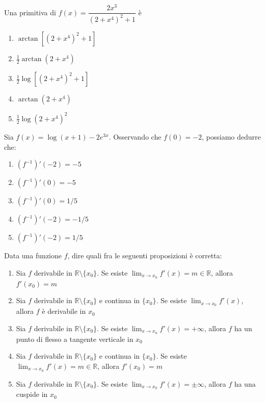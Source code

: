 \begin{quiz}
Una primitiva di $f(x)=\dfrac{2x^3}{(2+x^4)^2+1}$ \`e
\begin{enumerate}
\item $\arctan[(2+x^4)^2+1]$
\item $\frac12\arctan(2+x^4)$
\item $\frac12\log[(2+x^4)^2+1]$
\item $\arctan(2+x^4)$
\item $\frac12\log(2+x^4)^2$
\end{enumerate}
\end{quiz}

\begin{quiz}
Sia $f(x)=\log(x+1)-2e^{3x}$. Osservando che $f(0)=-2$, possiamo dedurre che:
\begin{enumerate}
\item $(f^{-1})\prime(-2)=-5$
\item $(f^{-1})\prime(0)=-5$
\item $(f^{-1})\prime(0)=1/5$
\item $(f^{-1})\prime(-2)=-1/5$
\item $(f^{-1})\prime(-2)=1/5$
\end{enumerate}
\end{quiz}

\begin{quiz}
Data una funzione $f$, dire quali fra le seguenti proposizioni \`e corretta:
\begin{enumerate}
\item Sia $f$ derivabile in $\mathbb R\setminus\{x_0\}$. Se esiste $\lim_{x\to x_0}f\prime(x)=m\in\mathbb R$, allora $f\prime(x_0)=m$
\item Sia $f$ derivabile in $\mathbb R\setminus\{x_0\}$ e continua in $\{x_0\}$. Se esiste $\lim_{x\to x_0}f\prime(x)$, allora $f$ \`e derivabile in $x_0$
\item Sia $f$ derivabile in $\mathbb R\setminus\{x_0\}$. Se esiste $\lim_{x\to x_0}f\prime(x)=+\infty$, allora $f$ ha un punto di flesso a tangente verticale in $x_0$
\item Sia $f$ derivabile in $\mathbb R\setminus\{x_0\}$ e continua in $\{x_0\}$. Se esiste $\lim_{x\to x_0}f\prime(x)=m\in\mathbb R$, allora $f\prime(x_0)=m$
\item Sia $f$ derivabile in $\mathbb R\setminus\{x_0\}$. Se esiste $\lim_{x\to x_0}f\prime(x)=\pm\infty$, allora $f$ ha una cuspide in $x_0$
\end{enumerate}
\end{quiz}

